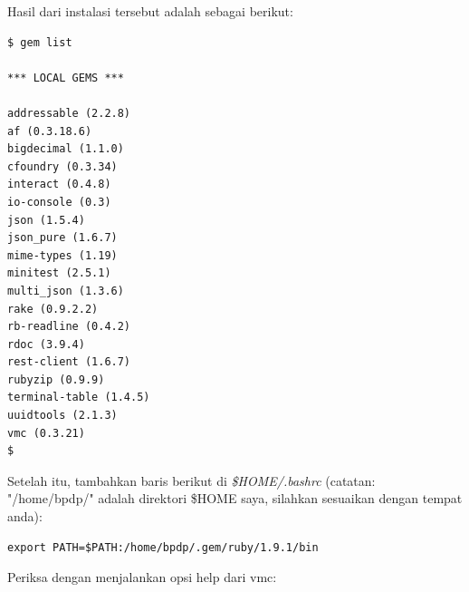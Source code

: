 Hasil dari instalasi tersebut adalah sebagai berikut:

\lstset{language=bash,caption=Hasil gem yang terinstall}
\begin{lstlisting}
$ gem list 

*** LOCAL GEMS *** 

addressable (2.2.8) 
af (0.3.18.6) 
bigdecimal (1.1.0) 
cfoundry (0.3.34) 
interact (0.4.8) 
io-console (0.3) 
json (1.5.4) 
json_pure (1.6.7) 
mime-types (1.19) 
minitest (2.5.1) 
multi_json (1.3.6) 
rake (0.9.2.2) 
rb-readline (0.4.2) 
rdoc (3.9.4) 
rest-client (1.6.7) 
rubyzip (0.9.9) 
terminal-table (1.4.5) 
uuidtools (2.1.3) 
vmc (0.3.21) 
$ 
\end{lstlisting}

Setelah itu, tambahkan baris berikut di \textit{\$HOME/.bashrc} (catatan: "/home/bpdp/" adalah direktori \$HOME saya, silahkan sesuaikan dengan tempat anda):

\lstset{language=bash,caption=Mengaktifkan direktori "bin" hasil instalasi gem}
\begin{lstlisting}
export PATH=$PATH:/home/bpdp/.gem/ruby/1.9.1/bin
\end{lstlisting}

Periksa dengan menjalankan opsi help dari vmc:


